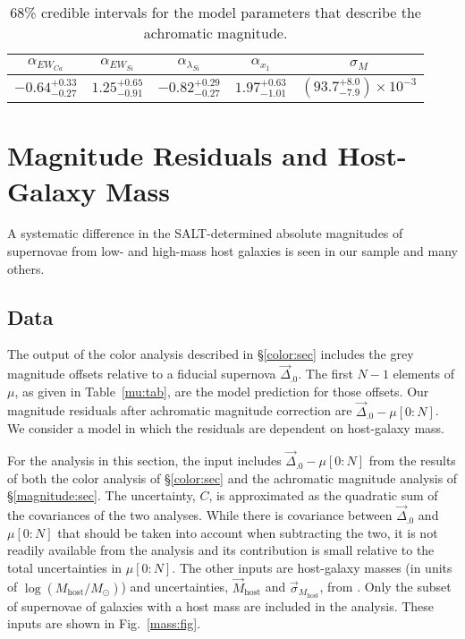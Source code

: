 \documentclass{aastex61}   	%
\begin{document}
\begin{table}
    \centering
    \caption{68\% credible intervals for the model parameters that describe the achromatic magnitude.}
    \label{magci:tab}
    \begin{tabular}{ccccc}
        \hline
		 $\alpha_{EW_{Ca}}$ & $\alpha_{EW_{Si}}$ & $\alpha_{\lambda_{Si}}$ & $\alpha_{x_1}$ & $\sigma_M$ \\ 
		\hline
		$-0.64^{+0.33}_{-0.27}$ & $1.25^{+0.65}_{-0.91}$ & $-0.82^{+0.29}_{-0.27}$ & $1.97^{+0.63}_{-1.01}$ & $\left( 93.7^{+8.0}_{-7.9} \right) \times 10^{-3}$ \\ 
		\hline
    \end{tabular}
\end{table}

\section{Magnitude Residuals and Host-Galaxy Mass}

A systematic difference in the SALT-determined absolute magnitudes of supernovae from low- and high-mass host galaxies is seen in
our sample and many others.

\subsection{Data}

The output of the color analysis
described in \S\ref{color:sec} includes the grey magnitude offsets relative to a fiducial supernova $\vec{\Delta}_{.0}$.
The first $N-1$ elements of $\mu$, as given in Table~\ref{mu:tab}, are the model prediction for those offsets.
Our magnitude residuals after achromatic magnitude correction are $\vec{\Delta}_{.0} - \mu[0:N]$.
We consider  a model in which the residuals are dependent
on host-galaxy mass.

For the analysis in this section, the input includes $\vec{\Delta}_{.0} - \mu[0:N]$ from
the results of both the color analysis of \S\ref{color:sec} and the achromatic magnitude analysis of 
\S\ref{magnitude:sec}.  The
uncertainty, $C$, is approximated as the quadratic sum of the covariances of the two analyses.  
While there is covariance between $\vec{\Delta}_{.0}$ and $\mu[0:N]$ that should be taken into account when
subtracting the two,  it is not readily available from the analysis
and its contribution is small relative to the total uncertainties in $\mu[0:N]$.
The other inputs are 
host-galaxy masses (in units of $\log{(M_{\mathrm{host}}/M_{\odot})}$) and uncertainties, $\vec{M}_{\text{host}}$  and
$\vec{\sigma}_{M_{\text{host}}}$,
from \citet{2013ApJ...770..108C}.  Only the subset of supernovae of galaxies with a host mass are included in the analysis.
These inputs are shown in Fig.~\ref{mass:fig}.
\end{document}
